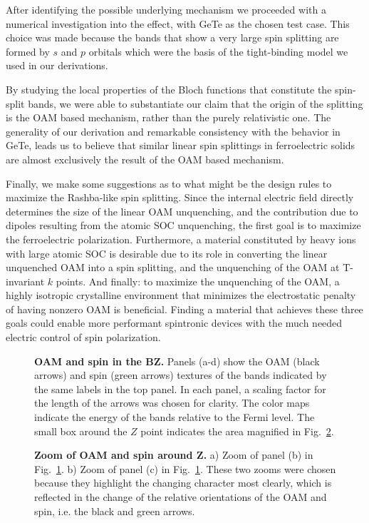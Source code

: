 After identifying the possible underlying mechanism we proceeded with a numerical investigation into the effect, with GeTe as the chosen test case.
This choice was made because the bands that show a very large spin splitting are formed by $s$ and $p$ orbitals which were the basis of the tight-binding model we used in our derivations.
    
By studying the local properties of the Bloch functions that constitute the spin-split bands, we were able to substantiate our claim that the origin of the splitting is the \gls{OAM} based mechanism, rather than the purely relativistic one.
The generality of our derivation and remarkable consistency with the behavior in GeTe, leads us to believe that similar linear spin splittings in ferroelectric solids are almost exclusively the result of the \gls{OAM} based mechanism.
    
Finally, we make some suggestions as to what might be the design rules to maximize the Rashba-like spin splitting.
Since the internal electric field directly determines the size of the linear \gls{OAM} unquenching, and the contribution due to dipoles resulting from the atomic \gls{SOC} unquenching, the first goal is to maximize the ferroelectric polarization.
Furthermore, a material constituted by heavy ions with large atomic \gls{SOC} is desirable due to its role in converting the linear unquenched \gls{OAM} into a spin splitting, and the unquenching of the \gls{OAM} at \gls{T}-invariant $k$ points.
And finally: to maximize the unquenching of the \gls{OAM}, a highly isotropic crystalline environment that minimizes the electrostatic penalty of having nonzero \gls{OAM} is beneficial.
Finding a material that achieves these three goals could enable more performant spintronic devices with the much needed electric control of spin polarization.
\begin{figure}
	\centering
  \caption{\label{fig:Rashba_textures}{\bf \gls{OAM} and spin in the \gls{BZ}.} Panels (a-d) show the \gls{OAM} (black arrows) and spin (green arrows) textures of the bands indicated by the same labels in the top panel. In each panel, a scaling factor for the length of the arrows was chosen for clarity. The color maps indicate the energy of the bands relative to the Fermi level. The small box around the $Z$ point indicates the area magnified in Fig.~\ref{fig:Rashba_textures_small}.}
\end{figure}
\begin{figure}
	\centering
  \caption{\label{fig:Rashba_textures_small}{\bf Zoom of \gls{OAM} and spin around Z.} a) Zoom of panel (b) in Fig.~\ref{fig:Rashba_textures}. b) Zoom of panel (c) in Fig.~\ref{fig:Rashba_textures}.  These two zooms were chosen because they highlight the changing character most clearly, which is reflected in the change of the relative orientations of the \gls{OAM} and spin, i.e. the black and green arrows.}
\end{figure}
